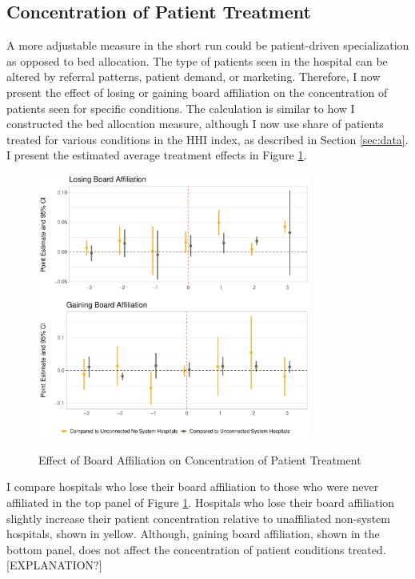 \documentclass[12pt]{article}
\begin{document}
    \subsection{Concentration of Patient Treatment}

    A more adjustable measure in the short run could be patient-driven specialization as opposed to bed allocation. The type of patients seen in the hospital can be altered by referral patterns, patient demand, or marketing. Therefore, I now present the effect of losing or gaining board affiliation on the concentration of patients seen for specific conditions. The calculation is similar to how I constructed the bed allocation measure, although I now use share of patients treated for various conditions in the HHI index, as described in Section \ref{sec:data}. I present the estimated average treatment effects in Figure \ref{fig:cms_hhi_did}. 

    \begin{figure}[ht!]
        \centering
        \caption{Effect of Board Affiliation on Concentration of Patient Treatment}
        \includegraphics[width=0.8\textwidth]{Objects/cms_hhi_did.pdf}
        \label{fig:cms_hhi_did}
    \end{figure}

    I compare hospitals who lose their board affiliation to those who were never affiliated in the top panel of Figure \ref{fig:cms_hhi_did}. Hospitals who lose their board affiliation slightly increase their patient concentration relative to unaffiliated non-system hospitals, shown in yellow. Although, gaining board affiliation, shown in the bottom panel, does not affect the concentration of patient conditions treated. [EXPLANATION?]
\end{document}
